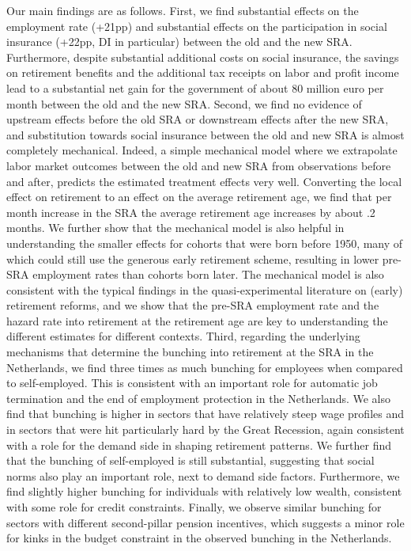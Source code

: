 \documentclass[12pt,a4paper]{article}
\begin{document}
Our main findings are as follows. First, we find substantial effects on the employment rate (+21pp) and substantial effects on the participation in social insurance (+22pp, DI in particular) between the old and the new SRA. Furthermore, despite substantial additional costs on social insurance, the savings on retirement benefits and the additional tax receipts on labor and profit income lead to a substantial net gain for the government of about 80 million euro per month between the old and the new SRA. Second, we find no evidence of upstream effects before the old SRA or downstream effects after the new SRA, and substitution towards social insurance between the old and new SRA is almost completely mechanical. Indeed, a simple mechanical model where we extrapolate labor market outcomes between the old and new SRA from observations before and after, predicts the estimated treatment effects very well. Converting the local effect on retirement to an effect on the average retirement age, we find that per month increase in the SRA the average retirement age increases by about .2 months. We further show that the mechanical model is also helpful in understanding the smaller effects for cohorts that were born before 1950, many of which could still use the generous early retirement scheme, resulting in lower pre-SRA employment rates than cohorts born later. The mechanical model is also consistent with the typical findings in the quasi-experimental literature on (early) retirement reforms, and we show that the pre-SRA employment rate and the hazard rate into retirement at the retirement age are key to understanding the different estimates for different contexts.  
Third, regarding the underlying mechanisms that determine the bunching into retirement at the SRA in the Netherlands, we find three times as much bunching for employees when compared to self-employed. This is consistent with an important role for automatic job termination and the end of employment protection in the Netherlands. We also find that bunching is higher in sectors that have relatively steep wage profiles and in sectors that were hit particularly hard by the Great Recession, again consistent with a role for the demand side in shaping retirement patterns. We further find that the bunching of self-employed is still substantial, suggesting that social norms also play an important role, next to demand side factors. Furthermore, we find slightly higher bunching for individuals with relatively low wealth, consistent with some role for credit constraints. Finally, we observe similar bunching for sectors with different second-pillar pension incentives, which suggests a minor role for kinks in the budget constraint in the observed bunching in the Netherlands.
\end{document}
